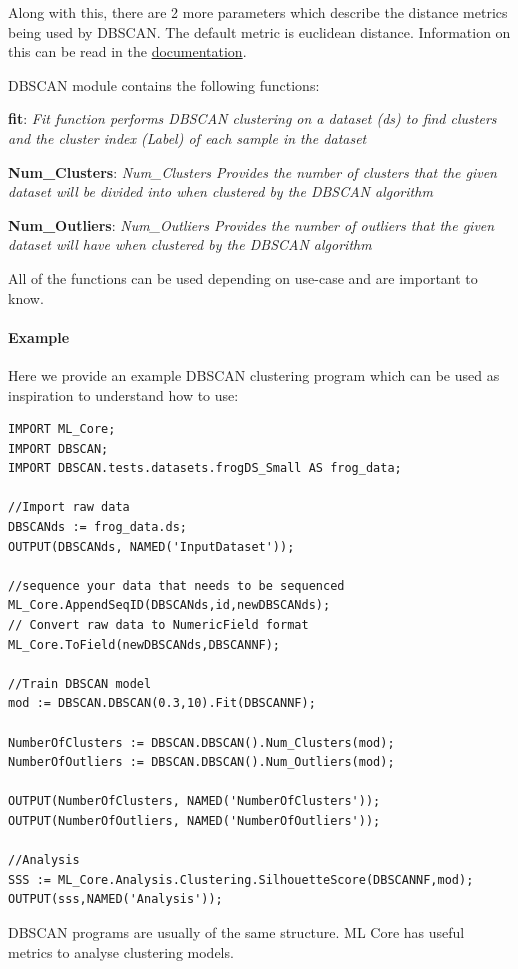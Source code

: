 \documentclass[a4paper,oneside,12pt]{book}
\begin{document}
Along with this, there are 2 more parameters which describe the distance metrics being used by DBSCAN. The default metric is euclidean distance. Information on this can be read in the \href{https://cdn.hpccsystems.com/pdf/ml/dbscan.pdf}{documentation}.

DBSCAN module contains the following functions:

\textbf{fit}: \textit{Fit function performs DBSCAN clustering on a dataset (ds) to find clusters and the cluster index (Label) of each sample in the dataset}

\textbf{Num\_Clusters}: \textit{Num\_Clusters Provides the number of clusters that the given dataset will be divided into when clustered by the DBSCAN algorithm}

\textbf{Num\_Outliers}: \textit{Num\_Outliers Provides the number of outliers that the given dataset will have when clustered by the DBSCAN algorithm}

All of the functions can be used depending on use-case and are important to know.

\paragraph{Example}

Here we provide an example DBSCAN clustering program which can be used as inspiration to understand how to use:

\begin{lstlisting}
IMPORT ML_Core;
IMPORT DBSCAN;
IMPORT DBSCAN.tests.datasets.frogDS_Small AS frog_data;

//Import raw data
DBSCANds := frog_data.ds;
OUTPUT(DBSCANds, NAMED('InputDataset'));

//sequence your data that needs to be sequenced
ML_Core.AppendSeqID(DBSCANds,id,newDBSCANds);
// Convert raw data to NumericField format
ML_Core.ToField(newDBSCANds,DBSCANNF);

//Train DBSCAN model 
mod := DBSCAN.DBSCAN(0.3,10).Fit(DBSCANNF);

NumberOfClusters := DBSCAN.DBSCAN().Num_Clusters(mod);
NumberOfOutliers := DBSCAN.DBSCAN().Num_Outliers(mod);

OUTPUT(NumberOfClusters, NAMED('NumberOfClusters'));
OUTPUT(NumberOfOutliers, NAMED('NumberOfOutliers'));

//Analysis
SSS := ML_Core.Analysis.Clustering.SilhouetteScore(DBSCANNF,mod);
OUTPUT(sss,NAMED('Analysis'));
\end{lstlisting}

DBSCAN programs are usually of the same structure. ML Core has useful metrics to analyse clustering models.
\end{document}
